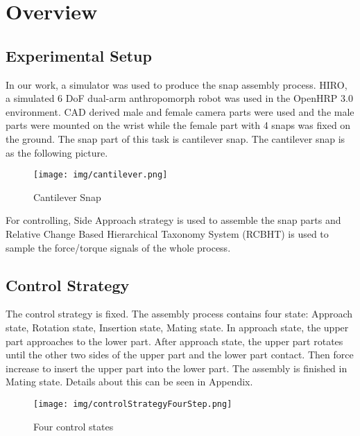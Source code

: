 %

\chapter{Overview}
\section{Experimental Setup}
In our work, a simulator was used to produce the snap assembly process. HIRO, a simulated 6 DoF dual-arm anthropomorph robot was used in the OpenHRP 3.0 environment. CAD derived male and female camera parts were used and the male parts were mounted on the wrist while the female part with 4 snaps was fixed on the ground. The snap part of this task is cantilever snap. The cantilever snap is as the following picture. \\
\begin{figure}
    \centering
    \texttt{[image: img/cantilever.png]}
    \caption{Cantilever Snap}
    \label{snap}
\end{figure}
\indent For controlling, Side Approach strategy is used to assemble the snap parts and Relative Change Based Hierarchical Taxonomy System (RCBHT) is used to sample the force/torque signals of the whole process.
\section{Control Strategy}
The control strategy is fixed. The assembly process contains four state: Approach state, Rotation state, Insertion state, Mating state. In approach state, the upper part approaches to the lower part. After approach state, the upper part rotates until the other two sides of the upper part and the lower part contact. Then force increase to insert the upper part into the lower part. The assembly is finished in Mating state. Details about this can be seen in Appendix.\\
\begin{figure}[h]
    \centering
    \texttt{[image: img/controlStrategyFourStep.png]}
    \caption{Four control states}
    \label{RCBHT}
\end{figure} 
